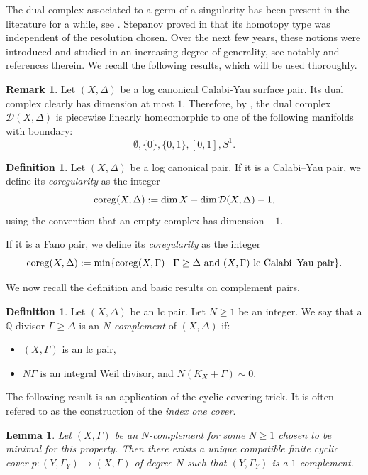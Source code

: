 \documentclass{amsart}
\newcommand{\qq}{\mathbb{Q}}
\newtheorem{lemma}[theorem]{Lemma}
\theoremstyle{definition}
\newtheorem{definition}[theorem]{Definition}
\newtheorem{remark}[theorem]{Remark}
\theoremstyle{remark}
\numberwithin{equation}{section}
\begin{document}
The dual complex associated to a germ of a singularity has been present in the literature for a while, see \cite{Gor80}. Stepanov proved in \cite{Ste06} that its homotopy type was independent of the resolution chosen. Over the next few years, these notions were introduced and studied in an increasing degree of generality, see notably \cite{FS20} and references therein. We recall the following results, which will be used thoroughly.

\begin{remark}\label{rem:dual-complex}
    Let $(X,\Delta)$ be a log canonical Calabi-Yau surface pair. Its dual complex clearly has dimension at most $1$. Therefore, by \cite[Theorem 1.6]{FS20}, the dual complex $\mathcal{D}(X,\Delta)$ is piecewise linearly homeomorphic to one of the following manifolds with boundary:
    $$\emptyset,\{0\},\{0,1\},[0,1],S^1.$$
\end{remark}



\begin{definition}\label{def:coreg}
Let $(X,\Delta)$ be a log canonical pair. If it is a Calabi--Yau pair, we define its {\it coregularity}  as the integer
$${\rm coreg}(X,\Delta):= \dim X - \dim \mathcal{D}(X,\Delta)-1,$$
using the convention that an empty complex has dimension $-1$.

If it is a Fano pair, we define its {\em coregularity} as the integer 
$${\rm coreg}(X,\Delta):= \min \{{\rm coreg}(X,\Gamma)\mid \Gamma\ge\Delta\mbox{ and }(X,\Gamma)\mbox{ lc Calabi--Yau pair}\}.$$
\end{definition}


We now recall the definition and basic results on complement pairs.

\begin{definition}
Let $(X,\Delta)$ be an lc pair. Let $N\ge 1$ be an integer. We say that a $\qq$-divisor $\Gamma\ge \Delta$ is an {\it $N$-complement} of $(X,\Delta)$ if:
\begin{itemize}
    \item $(X,\Gamma)$ is an lc pair,
    \item $N\Gamma$ is an integral Weil divisor, and $N(K_X+\Gamma)\sim 0$. 
\end{itemize}
\end{definition}

The following result is an application of the cyclic covering trick. It is often refered to as the construction of the {\it index one cover}.

\begin{lemma}\label{lem:index-one-cover}
    Let $(X,\Gamma)$ be an $N$-complement for some $N\ge 1$ chosen to be minimal for this property. Then there exists a unique compatible finite cyclic cover $p:(Y,\Gamma_Y)\to (X,\Gamma)$ of degree $N$ such that $(Y,\Gamma_Y)$ is a $1$-complement.
\end{lemma}
\end{document}
